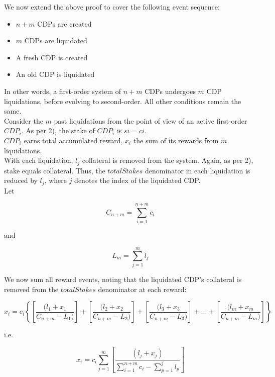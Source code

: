 \documentclass[reqno]{article}
\begin{document}
We now extend the above proof to cover the following event sequence:

\begin{itemize}
  \item $n+m$ CDPs are created
  \item $m$ CDPs are liquidated
  \item A fresh CDP is created
  \item An old CDP is liquidated
\end{itemize}

\bigskip
In other words, a first-order system of $n+m$ CDPs undergoes $m$ CDP liquidations, before evolving to second-order.  All other conditions remain the same.\\

Consider the $m$ past liquidations from the point of view of an active first-order $CDP_i$. As per 2), the stake of $CDP_i$ is $si = ci$.\\

$CDP_i$ earns total accumulated reward, $x_i$  the sum of its rewards from $m$ liquidations.\\

With each liquidation, $l_j$ collateral is removed from the system. Again, as per 2), stake equals collateral. Thus, the $totalStakes$ denominator in each liquidation is reduced by $l_j$, where $j$ denotes the index of the liquidated CDP.\\ 

Let

\begin{equation} 
    C_{n+m}=\sum\limits^{n+m}_{i=1}c_i
\end{equation}

\bigskip
and

\begin{equation} 
    L_m=\sum\limits^m_{j=1}l_j
\end{equation}

\bigskip
We now sum all reward events, noting that the liquidated CDP’s collateral is removed from the $totalStakes$ denominator at each reward:

\begin{equation} 
    x_i=c_i\left\{\left[\frac{(l_1+x_1}{C_{n+m}-L_1)}\right]+\left[\frac{(l_2+x_2}{C_{n+m}-L_2)}\right]+\left[\frac{(l_3+x_3}{C_{n+m}-L_3)}\right]+...+\left[\frac{(l_m+x_m}{C_{n+m}-L_m)}\right]\right\}
\end{equation}

\bigskip
i.e.

\begin{equation} 
    x_i=c_i\sum\limits^m_{j=1}\left[\frac{(l_j+x_j)}{\sum\limits^{n+m}_{i=1}c_i-\sum\limits^j_{p=1}l_p}\right]
\end{equation}
\end{document}
